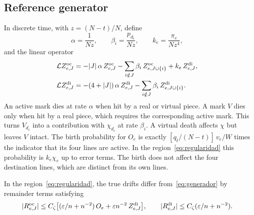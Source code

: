 \subsection{Reference generator}

In discrete time, with $z=(N-t)/N$, define \[
 \alpha=\frac1{Nz},\qquad \beta_i=\frac{p_{d_i}}{Nz},\qquad k_e=\frac{\pi_e}{Nz^4},
\] and the linear operator \begin{equation}\label{eq:generador}
\begin{aligned}
 \mathcal{L}
Z^{\mathrm{oc}}_{e,J}&=-|J|\,\alpha\,Z^{\mathrm{oc}}_{e,J}-\sum_{i\notin J}\beta_i\,Z^{\mathrm{oc}}_{e,J\cup\{i\}}+k_e\,Z^{\mathrm{di}}_{e,J},\\
 \mathcal{L} Z^{\mathrm{di}}_{e,J}&=-(4+|J|)\,\alpha\,Z^{\mathrm{di}}_{e,J}-\sum_{i\notin J}\beta_i\,Z^{\mathrm{di}}_{e,J\cup\{i\}} .
\end{aligned}
\end{equation} An active mark dies at rate $\alpha$ when hit by a real or virtual piece. A mark $V$ dies
only when hit by a real piece,
which requires the corresponding active mark. This turns $V_{d_i}$ into a contribution with $\chi_{d_i}$ at
rate $\beta_i$. A virtual
death affects $\chi$ but leaves $V$ intact. The birth probability for $O_e$ is exactly $[q_t/(N-t)]\,v_e/W$
times the indicator that
its four lines are active. In the region~\eqref{eq:regularidad} this probability is $k_e\chi_e$ up to error
terms. The birth does not
affect the four destination lines, which are distinct from its own lines.

\begin{lema}\label{lem:generador} In the region~\eqref{eq:regularidad},
the true drifts differ
from~\eqref{eq:generador} by remainder terms satisfying \[
 |R^{\mathrm{oc}}_{e,J}|\le C_\zeta\bigl[(\varepsilon/n+n^{-2})\,O_e+\varepsilon n^{-2}\,Z^{\mathrm{di}}_{e,J}\bigr],\qquad
 |R^{\mathrm{di}}_{e,J}|\le C_\zeta(\varepsilon/n+n^{-2}).
\] \end{lema}

